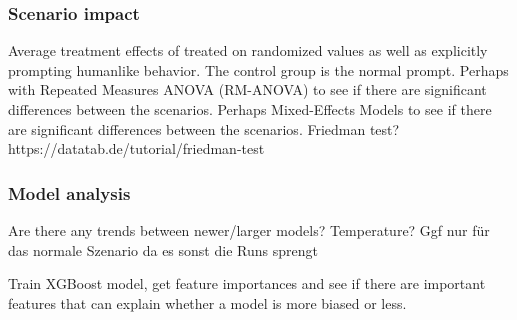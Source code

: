 \subsubsection{Scenario impact}
Average treatment effects of treated on randomized values as well as explicitly prompting humanlike behavior. The control group is the normal prompt.
Perhaps with Repeated Measures ANOVA (RM-ANOVA) to see if there are significant differences between the scenarios.
Perhaps Mixed-Effects Models to see if there are significant differences between the scenarios.
Friedman test? https://datatab.de/tutorial/friedman-test

\subsubsection{Model analysis}
Are there any trends between newer/larger models?
Temperature? Ggf nur für das normale Szenario da es sonst die Runs sprengt

Train XGBoost model, get feature importances and see if there are important features that can explain whether a model is more biased or less.
